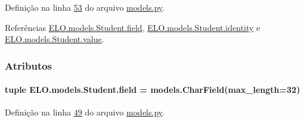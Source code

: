 Definição na linha \hyperlink{ELO_2models_8py_source_l00053}{53} do arquivo \hyperlink{ELO_2models_8py_source}{models.\-py}.



Referências \hyperlink{classELO_1_1models_1_1Student_a893ec9b2ece5c6b829fce5e5a7c1d576}{E\-L\-O.\-models.\-Student.\-field}, \hyperlink{classELO_1_1models_1_1Student_a20a7789a2b0f5b7d0c98453dcf38bc4e}{E\-L\-O.\-models.\-Student.\-identity} e \hyperlink{classELO_1_1models_1_1Student_a201226779dce6e064cb16bd92ed016e2}{E\-L\-O.\-models.\-Student.\-value}.




\subsubsection{Atributos}
\hypertarget{classELO_1_1models_1_1Student_a893ec9b2ece5c6b829fce5e5a7c1d576}{
\paragraph[{field}]{\setlength{\rightskip}{0pt plus 5cm}tuple E\-L\-O.\-models.\-Student.\-field = models.\-Char\-Field(max\-\_\-length=32)\hspace{0.3cm}{\ttfamily [static]}}}\label{classELO_1_1models_1_1Student_a893ec9b2ece5c6b829fce5e5a7c1d576}


Definição na linha \hyperlink{ELO_2models_8py_source_l00049}{49} do arquivo \hyperlink{ELO_2models_8py_source}{models.\-py}.




